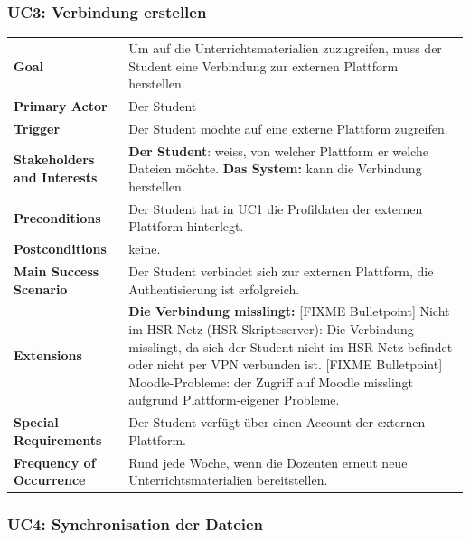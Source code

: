 \documentclass[a4paper]{article}
\begin{document}
\subsubsection{UC3: Verbindung erstellen}
\begin{tabulary}{\linewidth}{lp{30em}}
	\textbf{Goal} & Um auf die Unterrichtsmaterialien zuzugreifen, muss der Student eine Verbindung zur externen Plattform herstellen. \\
	\textbf{Primary Actor} & Der Student \\
	\textbf{Trigger} & Der Student möchte auf eine externe Plattform zugreifen. \\
	\textbf{Stakeholders and Interests} & \textbf{Der Student}: weiss, von welcher Plattform er welche Dateien möchte. \textbf{Das System:} kann die Verbindung herstellen. \\
	\textbf{Preconditions} & Der Student hat in UC1 die Profildaten der externen Plattform hinterlegt.\\
	\textbf{Postconditions} & keine.\\
	\textbf{Main Success Scenario} & Der Student verbindet sich zur externen Plattform, die Authentisierung ist erfolgreich. \\
	\textbf{Extensions} & \textbf{Die Verbindung misslingt:} [FIXME Bulletpoint] Nicht im HSR-Netz (HSR-Skripteserver): Die Verbindung misslingt, da sich der Student nicht im HSR-Netz befindet oder nicht per VPN verbunden ist. [FIXME Bulletpoint] Moodle-Probleme: der Zugriff auf Moodle misslingt aufgrund Plattform-eigener Probleme.\\
	\textbf{Special Requirements} & Der Student verfügt über einen Account der externen Plattform. \\
	\textbf{Frequency of Occurrence} & Rund jede Woche, wenn die Dozenten erneut neue Unterrichtsmaterialien bereitstellen. \\
\end{tabulary}


\subsubsection{UC4: Synchronisation der Dateien}
\end{document}
